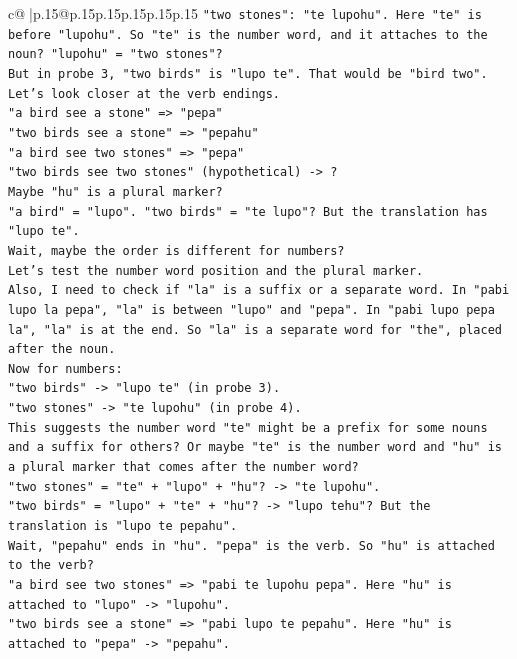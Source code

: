 \documentclass{article}
\begin{document}
{\begin{supertabular}{c@{$\;$}|p{.15\linewidth}@{}p{.15\linewidth}p{.15\linewidth}p{.15\linewidth}p{.15\linewidth}p{.15\linewidth}}
{{{\texttt{"two stones": "te lupohu". Here "te" is before "lupohu". So "te" is the number word, and it attaches to the noun? "lupohu" = "two stones"?} \\
\texttt{But in probe 3, "two birds" is "lupo te". That would be "bird two".} \\
\texttt{Let's look closer at the verb endings.} \\
\texttt{"a bird see a stone" => "pepa"} \\
\texttt{"two birds see a stone" => "pepahu"} \\
\texttt{"a bird see two stones" => "pepa"} \\
\texttt{"two birds see two stones" (hypothetical) {-}> ?} \\
\texttt{Maybe "hu" is a plural marker?} \\
\texttt{"a bird" = "lupo". "two birds" = "te lupo"? But the translation has "lupo te".} \\
\texttt{Wait, maybe the order is different for numbers?} \\
\texttt{Let's test the number word position and the plural marker.} \\
\texttt{Also, I need to check if "la" is a suffix or a separate word. In "pabi lupo la pepa", "la" is between "lupo" and "pepa". In "pabi lupo pepa la", "la" is at the end. So "la" is a separate word for "the", placed after the noun.} \\
\texttt{Now for numbers:} \\
\texttt{"two birds" {-}> "lupo te" (in probe 3).} \\
\texttt{"two stones" {-}> "te lupohu" (in probe 4).} \\
\texttt{This suggests the number word "te" might be a prefix for some nouns and a suffix for others? Or maybe "te" is the number word and "hu" is a plural marker that comes after the number word?} \\
\texttt{"two stones" = "te" + "lupo" + "hu"? {-}> "te lupohu".} \\
\texttt{"two birds" = "lupo" + "te" + "hu"? {-}> "lupo tehu"? But the translation is "lupo te pepahu".} \\
\texttt{Wait, "pepahu" ends in "hu". "pepa" is the verb. So "hu" is attached to the verb?} \\
\texttt{"a bird see two stones" => "pabi te lupohu pepa". Here "hu" is attached to "lupo" {-}> "lupohu".} \\
\texttt{"two birds see a stone" => "pabi lupo te pepahu". Here "hu" is attached to "pepa" {-}> "pepahu".} \\
}}}
\end{supertabular}}
\end{document}
